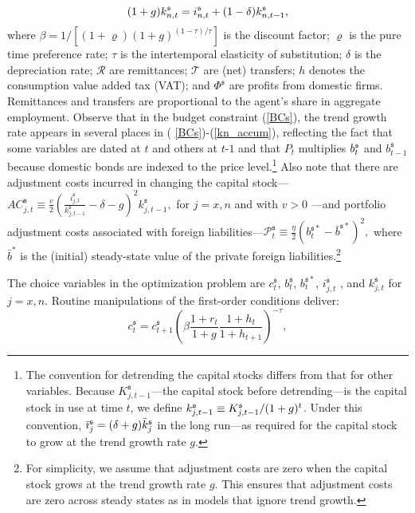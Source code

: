 \documentclass[11pt]{article}
\begin{document}
\begin{equation}
(1+g)k_{n,t}^{\mathfrak{s}}=i_{n,t}^{\mathfrak{s}}+(1-\delta )k_{n,t-1}^{%
\mathfrak{s}},  \label{kn_accum}
\end{equation}%
where $\beta =1/[(1+\varrho )(1+g)^{(1-\tau )/\tau }]$ is the discount
factor; $\varrho $ is the pure time preference rate; $\tau $ is the
intertemporal elasticity of substitution; $\delta $ is the depreciation
rate; $\mathcal{R}$ are remittances; $\mathcal{T}$ are (net) transfers; $h$
denotes the consumption value added tax (VAT); and $\Phi ^{\mathfrak{s}}$
are profits from domestic firms. Remittances and transfers are proportional
to the agent's share in aggregate employment. Observe that in the budget
constraint (\ref{BCs}), the trend growth rate appears in several places in (%
\ref{BCs})-(\ref{kn_accum}), reflecting the fact that some variables are
dated at $t$ and others at $t$-$1$ and that $P_{t}$ multiplies $b_{t}^{%
\mathfrak{s}}$ and $b_{t-1}^{\mathfrak{s}}$because domestic bonds are
indexed to the price level.\footnote{%
The convention for detrending the capital stocks differs from that for other
variables. Because $K_{j,t-1}^{\mathfrak{s}}$---the capital stock before
detrending---is the capital stock in use at time $t$, we define $k_{j,t-1}^{%
\mathfrak{s}}\equiv K_{j,t-1}^{\mathfrak{s}}/(1+g)^{t}$. Under this
convention, $\bar{\imath}_{j}^{\mathfrak{s}}=(\delta +g)\bar{k}_{j}^{%
\mathfrak{s}}$ in the long run---as required for the capital stock to grow
at the trend growth rate $g$.} Also note that there are adjustment costs
incurred in changing the capital stock---$AC_{j,t}^{\mathfrak{s}}\equiv 
\frac{v}{2}\left( \frac{i_{j,t}^{\mathfrak{s}}}{k_{j,t-1}^{\mathfrak{s}}}%
-\delta -g\right) ^{2}k_{j,t-1}^{\mathfrak{s}},$ for $j=x,n$ and with $v>0$%
---and portfolio adjustment costs associated with foreign liabilities---$%
\mathcal{P}_{t}^{\mathfrak{s}}\equiv \frac{\eta }{2}(b_{t}^{\mathfrak{s}\ast
}-\bar{b}^{\mathfrak{s}\ast })^{2},$ where $\bar{b}^{\ast }$ is the
(initial) steady-state value of the private foreign liabilities.\footnote{%
For simplicity, we assume that adjustment costs are zero when the capital
stock grows at the trend growth rate $g$. This ensures that adjustment costs
are zero across steady states as in models that ignore trend growth.}

The choice variables in the optimization problem are $c_{t}^{\mathfrak{s}}$, 
$b_{t}^{\mathfrak{s}}$, $b_{t}^{\mathfrak{s}\ast }$, $i_{j,t}^{\mathfrak{s}}$%
, and $k_{j,t}^{\mathfrak{s}}$ for $j=x,n$. Routine manipulations of the
first-order conditions deliver: 
\begin{equation}
c_{t}^{\mathfrak{s}}=c_{t+1}^{\mathfrak{s}}\left( \beta \frac{1+r_{t}}{1+g}%
\frac{1+h_{t}}{1+h_{t+1}}\right) ^{-\tau },  \label{Euler Equation}
\end{equation}
\end{document}
